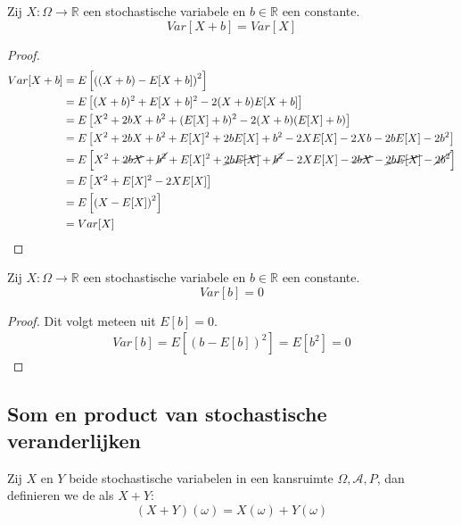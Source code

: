 \documentclass[main.tex]{subfiles}
\begin{document}
\begin{ei}
  Zij $X: \Omega \rightarrow \mathbb{R}$ een stochastische variabele en $b\in \mathbb{R}$ een constante.
  \[ Var[X+b] = Var[X] \]

  \begin{proof}
    \begin{align*}
      Var[X+b]
      &= E\left[\left((X+b) - E[X+b]\right)^{2}\right]\\
      &= E\left[(X+b)^{2} + E[X+b]^{2} -2(X+b)E[X+b]\right]\\
      &= E\left[X^{2} + 2bX+b^{2} + (E[X]+b)^{2} - 2(X+b)(E[X]+b)\right]\\
      &= E\left[X^{2} + 2bX+b^{2} + E[X]^{2} + 2bE[X] + b^{2} - 2XE[X] -2Xb -2bE[X] -2b^{2}\right]\\
      &= E\left[X^{2} + \cancel{2bX} + \cancel{b^{2}} + E[X]^{2} + \cancel{2bE[X]} + \cancel{b^{2}} - 2XE[X] -\cancel{2bX} -\cancel{2bE[X]} - \cancel{2b^{2}}\right]\\
      &= E\left[X^{2} + E[X]^{2} - 2XE[X]\right]\\
      &= E\left[\left(X - E[X]\right)^{2}\right]\\
      &= Var[X]
    \end{align*}
  \end{proof}
\end{ei}

\begin{ei}
  Zij $X: \Omega \rightarrow \mathbb{R}$ een stochastische variabele en $b\in \mathbb{R}$ een constante.
  \[ Var[b] = 0 \]

  \begin{proof}
    Dit volgt meteen uit $E[b] = 0$.
    \begin{align*}
      Var[b]
      = E\left[\left(b - E[b]\right)^{2}\right]
      = E\left[b^{2}\right]
      = 0
    \end{align*}
  \end{proof}
\end{ei}

\subsection{Som en product van stochastische veranderlijken}
\label{sec:som-en-product}

\begin{de}
  Zij $X$ en $Y$ beide stochastische variabelen in een kansruimte $\Omega,\mathcal{A},P$, dan definieren we de  als $X+Y$:
  \[ (X+Y)(\omega) = X(\omega) + Y(\omega) \]
\end{de}
\end{document}
